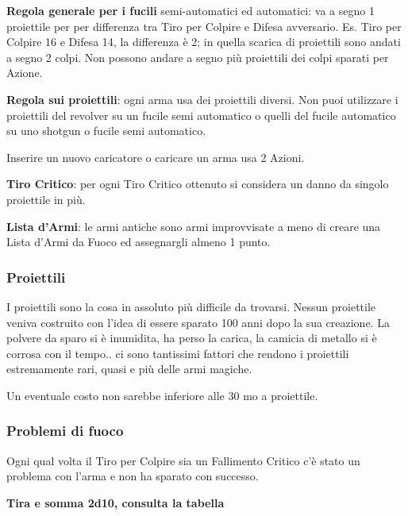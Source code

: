 \begin{multicols}{2}
\medskip

\textbf{Regola generale per i fucili} semi-automatici ed automatici: va a segno 1 proiettile per per differenza tra Tiro per Colpire e Difesa avversario. Es. Tiro per Colpire 16 e Difesa 14, la differenza è 2; in quella scarica di proiettili sono andati a segno 2 colpi. Non possono andare a segno più proiettili dei colpi sparati per Azione.

\textbf{Regola sui proiettili}: ogni arma usa dei proiettili diversi. Non puoi utilizzare i proiettili del revolver su un fucile semi automatico o quelli del fucile automatico su uno shotgun o fucile semi automatico.

 Inserire un nuovo caricatore o caricare un arma usa 2 Azioni.

\textbf{Tiro Critico}: per ogni Tiro Critico ottenuto si considera un danno da singolo proiettile in più.

\textbf{Lista d'Armi}: le armi antiche sono armi improvvisate a meno di creare una Lista d'Armi da Fuoco ed assegnargli almeno 1 punto.

\subsubsection*{Proiettili}

I proiettili sono la cosa in assoluto più difficile da trovarsi. Nessun proiettile veniva costruito con l'idea di essere sparato 100 anni dopo la sua creazione.
La polvere da sparo si è inumidita, ha perso la carica, la camicia di metallo si è corrosa con il tempo.. ci sono tantissimi fattori che rendono i proiettili estremamente rari, quasi e più delle armi magiche.

Un eventuale costo non sarebbe inferiore alle 30 mo a proiettile.

\subsubsection*{Problemi di fuoco}

Ogni qual volta il Tiro per Colpire sia un Fallimento Critico c'è stato un problema con l'arma e non ha sparato con successo.

\medskip

\textbf{Tira e somma 2d10, consulta la tabella}

\medskip


\end{multicols}
